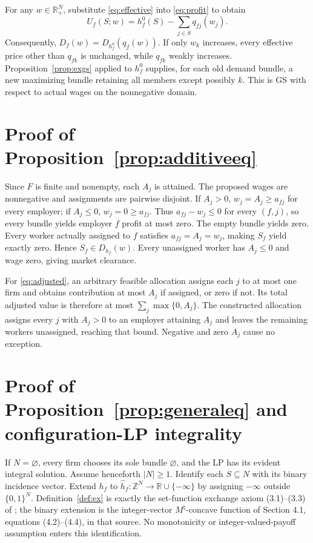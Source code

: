 \documentclass[11pt]{article}
\theoremstyle{definition}
\theoremstyle{remark}
\numberwithin{equation}{section}
\begin{document}
For any $w\in\mathbb R_+^N$, substitute \eqref{eq:effective} into \eqref{eq:profit} to obtain
\[
U_f(S;w)=h_f^0(S)-\sum_{j\in S}q_{fj}(w_j).
\]
Consequently, $D_f(w)=D_{h_f^0}(q_f(w))$. If only $w_k$ increases, every effective price other than $q_{fk}$ is unchanged, while $q_{fk}$ weakly increases. Proposition~\ref{prop:exgs} applied to $h_f^0$ supplies, for each old demand bundle, a new maximizing bundle retaining all members except possibly $k$. This is GS with respect to actual wages on the nonnegative domain.

\section{Proof of Proposition~\ref{prop:additiveeq}}\label{app:additiveeq}

Since $F$ is finite and nonempty, each $A_j$ is attained. The proposed wages are nonnegative and assignments are pairwise disjoint. If $A_j>0$, $w_j=A_j\ge a_{fj}$ for every employer; if $A_j\le0$, $w_j=0\ge a_{fj}$. Thus $a_{fj}-w_j\le0$ for every $(f,j)$, so every bundle yields employer $f$ profit at most zero. The empty bundle yields zero. Every worker actually assigned to $f$ satisfies $a_{fj}=A_j=w_j$, making $S_f$ yield exactly zero. Hence $S_f\in D_{h_f}(w)$. Every unassigned worker has $A_j\le0$ and wage zero, giving market clearance.

For \eqref{eq:adjusted}, an arbitrary feasible allocation assigns each $j$ to at most one firm and obtains contribution at most $A_j$ if assigned, or zero if not. Its total adjusted value is therefore at most $\sum_j\max\{0,A_j\}$. The constructed allocation assigns every $j$ with $A_j>0$ to an employer attaining $A_j$ and leaves the remaining workers unassigned, reaching that bound. Negative and zero $A_j$ cause no exception.

\section{Proof of Proposition~\ref{prop:generaleq} and configuration-LP integrality}\label{app:lp}

If $N=\varnothing$, every firm chooses its sole bundle $\varnothing$, and the LP has its evident integral solution. Assume henceforth $|N|\ge1$. Identify each $S\subseteq N$ with its binary incidence vector. Extend $h_f$ to $\widehat h_f:\mathbb Z^N\to\mathbb R\cup\{-\infty\}$ by assigning $-\infty$ outside $\{0,1\}^N$. Definition~\ref{def:ex} is exactly the set-function exchange axiom (3.1)--(3.3) of \citet[Section 3.1]{Murota2022}; the binary extension is the integer-vector $M^\natural$-concave function of Section 4.1, equations (4.2)--(4.4), in that source. No monotonicity or integer-valued-payoff assumption enters this identification.
\end{document}
